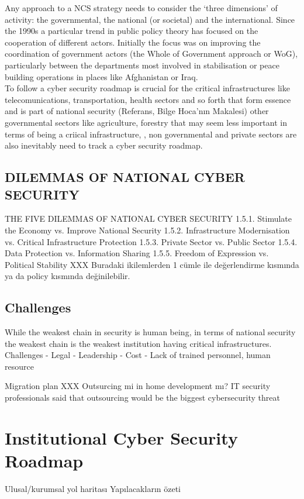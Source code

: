 \documentclass[journal]{IEEEtran}
\begin{document}
Any approach to a NCS strategy needs to consider the ‘three dimensions’ of activity:
the governmental, the national (or societal) and the international. Since the 1990s a
particular trend in public policy theory has focused on the cooperation of different
actors. Initially the focus was on improving the coordination of government
actors (the Whole of Government approach or WoG), particularly between the
departments most involved in stabilisation or peace building operations in places like Afghanistan or Iraq.
\\


To follow a cyber security roadmap is crucial for the critical infrastructures like telecomunications, transportation, health sectors and so forth that form essence and  is part of national security (Referans, Bilge Hoca’nın Makalesi) other governmental sectors like agriculture, forestry that may seem less important in terms of being a criical infrastructure,  , non governmental and private sectors are also inevitably need to track a cyber security roadmap.
\\

\subsection{ DILEMMAS OF NATIONAL CYBER SECURITY}
THE FIVE DILEMMAS OF NATIONAL CYBER SECURITY
1.5.1. Stimulate the Economy vs. Improve National Security
1.5.2. Infrastructure Modernisation vs. Critical Infrastructure Protection
1.5.3. Private Sector vs. Public Sector
1.5.4. Data Protection vs. Information Sharing
1.5.5. Freedom of Expression vs. Political Stability\cite{kurt2012cyber} XXX Buradaki ikilemlerden 1  cümle ile değerlendirme kısmında ya da  policy kısmında değinilebilir.
\subsection{Challenges}
While the weakest chain in security is human being, in terms of national security the weakest chain is the weakest institution having critical infrastructures.
\\
Challenges
- Legal
- Leadership
- Cost
- Lack of trained personnel, human resource

Migration plan
XXX Outsurcing mi in home development mı?
IT security professionals said that outsourcing would be the biggest cybersecurity threat

\section{Institutional Cyber Security Roadmap}
Ulusal/kurumsal yol haritası Yapılacakların özeti
\end{document}
